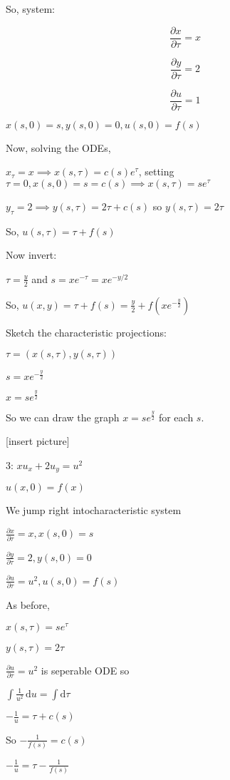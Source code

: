 \documentclass{article}
\theoremstyle{definition}
\begin{document}
So, system:

\[
    \frac{\partial x}{\partial \tau} = x
\]

\[
    \frac{\partial y}{\partial \tau} = 2
\]

\[
    \frac{\partial u}{\partial \tau} = 1
\]

\(x(s,0)=s,y(s,0)=0,u(s,0)=f(s)\) 

Now, solving the ODEs,

\(x_\tau = x \implies x(s,\tau)=c(s)e^\tau\), setting \(\tau=0, x(s,0)=s=c(s) \implies x(s,\tau) = s e^\tau\)

\(y_\tau=2\implies y(s,\tau)=2\tau+c(s)\) so \(y(s,\tau)=2\tau\)  

So, \(u(s,\tau)=\tau + f(s)\) 

Now invert:

\(\tau = \frac{y}{2}\) and \(s = x e^{-\tau} = x e^{-y / 2}\)

So, \(u(x,y) = \tau + f(s) = \frac{y}{2} + f \left( x e ^{- \frac{y}{2}} \right) \) 

Sketch the characteristic projections:

\(\tau = (x(s,\tau),y(s,\tau))\) 

\(s = x e^{-\frac{y}{2}}\)

\(x =s e^{\frac{y}{2}}\)

So we can draw the graph \(x = s e^{\frac{y}{2}}\) for each \(s\).

[insert picture]

3: \(x u_x + 2 u_y = u^2\) 

\(u(x,0)=f(x)\) 

We jump right intocharacteristic system

\(\frac{\partial x}{\partial \tau} = x, x(s,0)=s\)

\(\frac{\partial y}{\partial \tau} = 2, y(s,0)=0\) 

\(\frac{\partial u}{\partial \tau} = u^2, u(s,0)=f(s)\) 

As before,

\(x(s,\tau)= s e^\tau\) 

\(y(s,\tau) = 2\tau\) 

\(\frac{\partial u}{\partial \tau} = u^2\) is seperable ODE so

\(\int \frac{1}{u^2}\,\mathrm{d} u = \int \mathrm{d} \tau\)

\(- \frac{1}{u} = \tau + c(s)\) 

So \(-\frac{1}{f(s)} = c(s)\)

\(- \frac{1}{u} = \tau - \frac{1}{f(s)}\)
\end{document}
